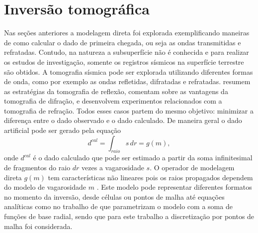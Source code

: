 \section{Inversão tomográfica}

Nas seções anteriores a modelagem direta foi explorada exemplificando maneiras de como calcular o dado de primeira chegada, ou seja as ondas transmitidas e refratadas. Contudo, na natureza a subsuperfície não é conhecida e para realizar os estudos de investigação, somente os registros sísmicos na superfície terrestre são obtidos. A tomografia sísmica pode ser explorada utilizando diferentes formas de onda, como por exemplo as ondas refletidas, difratadas e refratadas.  resumem as estratégias da tomografia de reflexão,  comentam sobre as vantagens da tomografia de difração,  e  desenvolvem experimentos relacionados com a tomografia de refração. Todos esses casos partem do mesmo objetivo: minimizar a diferença entre o dado observado e o dado calculado. De maneira geral o dado artificial pode ser gerado pela equação
\begin{equation}
	d^{cal} = \displaystyle\int_{raio} s\,dr = g(m),
\end{equation}
\noindent onde $d^{cal}$ é o dado calculado que pode ser estimado a partir da soma infinitesimal de fragmentos do raio $dr$ vezes a vagarosidade $s$. O operador de modelagem direta $g(m)$ tem características não lineares pois os raios propagados dependem do modelo de vagarosidade $m$ \cite{seo2012nonlinear}. Este modelo pode representar diferentes formatos no momento da inversão, desde células ou pontos de malha até equações analíticas como no trabalho de  que parametrizam o modelo com a soma de funções de base radial, sendo que para este trabalho a discretização por pontos de malha foi considerada. 

